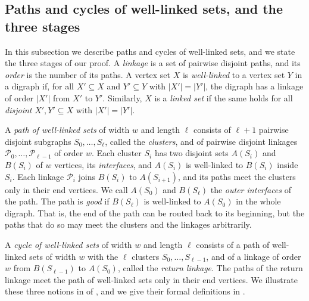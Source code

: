 \documentclass[fontsize=12pt,leading=14pt]{fullpaper}
\newcommand{\Pcal}{\mathcal{P}}
\begin{document}

\subsection{Paths and cycles of well-linked sets, and the three stages}\label{sec:intro-stages}

In this subsection we describe paths and cycles of well-linked sets, and we state the three stages of our proof.
A \emph{linkage} is a set of pairwise disjoint paths, and its \emph{order} is the number of its paths.
A vertex set $X$ is \emph{well-linked} to a vertex set $Y$ in a digraph if, for all $X'\subseteq X$ and $Y'\subseteq Y$ with $|X'|=|Y'|$, the digraph has a linkage of order $|X'|$ from $X'$ to $Y'$.
Similarly, $X$ is a \emph{linked set} if the same holds for all \textsl{disjoint} $X',Y'\subseteq X$ with $|X'|=|Y'|$.

A \emph{path of well-linked sets} of width $w$ and length $\ell$ consists of $\ell+1$ pairwise disjoint subgraphs $S_0,\dots,S_\ell$, called the \emph{clusters}, and of pairwise disjoint linkages $\Pcal_0,\dots,\Pcal_{\ell-1}$ of order $w$.
Each cluster $S_i$ has two disjoint sets $A(S_i)$ and $B(S_i)$ of $w$ vertices, its \emph{interfaces}, and $A(S_i)$ is well-linked to $B(S_i)$ inside $S_i$.
Each linkage $\Pcal_i$ joins $B(S_i)$ to $A(S_{i+1})$, and its paths meet the clusters only in their end vertices.
We call $A(S_0)$ and $B(S_\ell)$ the \emph{outer interfaces} of the path.
The path is \emph{good} if $B(S_\ell)$ is well-linked to $A(S_0)$ in the whole digraph.
That is, the end of the path can be routed back to its beginning, but the paths that do so may meet the clusters and the linkages arbitrarily.

A \emph{cycle of well-linked sets} of width $w$ and length $\ell$ consists of a path of well-linked sets of width $w$ with the $\ell$ clusters $S_0,\dots,S_{\ell-1}$, and of a linkage of order $w$ from $B(S_{\ell-1})$ to $A(S_0)$, called the \emph{return linkage}.
The paths of the return linkage meet the path of well-linked sets only in their end vertices.
We illustrate these three notions in  of , and we give their formal definitions in .
\end{document}
